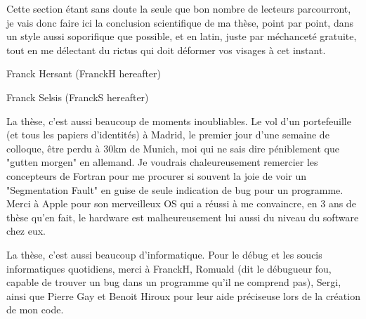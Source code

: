 Cette section étant sans doute la seule que bon nombre de lecteurs parcourront, je vais donc faire ici la conclusion scientifique de ma thèse, point par point, dans un style aussi soporifique que possible, et en latin, juste par méchanceté gratuite, tout en me délectant du rictus qui doit déformer vos visages à cet instant. 




Franck Hersant (FranckH hereafter)


Franck Selsis (FranckS hereafter)



La thèse, c'est aussi beaucoup de moments inoubliables. Le vol d'un portefeuille (et tous les papiers d'identités) à Madrid, le premier jour d'une semaine de colloque, être perdu à 30km de Munich, moi qui ne sais dire péniblement que "gutten morgen" en allemand. Je voudrais chaleureusement remercier les concepteurs de Fortran pour me procurer si souvent la joie de voir un "Segmentation Fault" en guise de seule indication de bug pour un programme. Merci à Apple pour son merveilleux OS qui a réussi à me convaincre, en 3 ans de thèse qu'en fait, le hardware est malheureusement lui aussi du niveau du software chez eux. 

La thèse, c'est aussi beaucoup d'informatique. Pour le débug et les soucis informatiques quotidiens, merci à FranckH, Romuald (dit le débugueur fou, capable de trouver un bug dans un programme qu'il ne comprend pas), Sergi, ainsi que Pierre Gay et Benoit Hiroux pour leur aide préciseuse lors de la création de mon code. 


